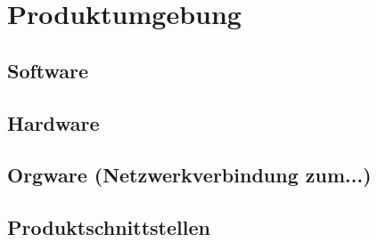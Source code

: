 \chapter{Produktumgebung}

\section{Software}

\section{Hardware}

\section{Orgware (Netzwerkverbindung zum...)}

\section{Produktschnittstellen}
